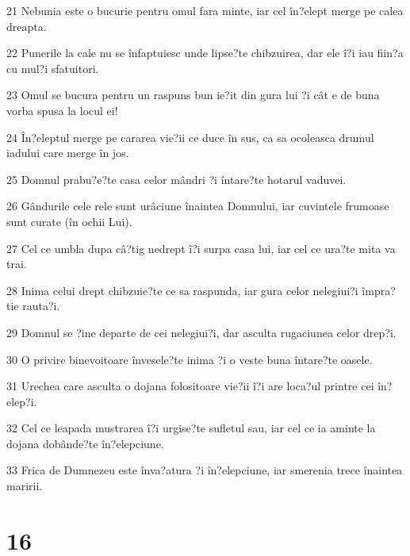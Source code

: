 \par 21 Nebunia este o bucurie pentru omul fara minte, iar cel în?elept merge pe calea dreapta.
\par 22 Punerile la cale nu se înfaptuiesc unde lipse?te chibzuirea, dar ele î?i iau fiin?a cu mul?i sfatuitori.
\par 23 Omul se bucura pentru un raspuns bun ie?it din gura lui ?i cât e de buna vorba spusa la locul ei!
\par 24 În?eleptul merge pe cararea vie?ii ce duce în sus, ca sa ocoleasca drumul iadului care merge în jos.
\par 25 Domnul prabu?e?te casa celor mândri ?i întare?te hotarul vaduvei.
\par 26 Gândurile cele rele sunt urâciune înaintea Domnului, iar cuvintele frumoase sunt curate (în ochii Lui).
\par 27 Cel ce umbla dupa câ?tig nedrept î?i surpa casa lui, iar cel ce ura?te mita va trai.
\par 28 Inima celui drept chibzuie?te ce sa raspunda, iar gura celor nelegiui?i împra?tie rauta?i.
\par 29 Domnul se ?ine departe de cei nelegiui?i, dar asculta rugaciunea celor drep?i.
\par 30 O privire binevoitoare învesele?te inima ?i o veste buna întare?te oasele.
\par 31 Urechea care asculta o dojana folositoare vie?ii î?i are loca?ul printre cei în?elep?i.
\par 32 Cel ce leapada mustrarea î?i urgise?te sufletul sau, iar cel ce ia aminte la dojana dobânde?te în?elepciune.
\par 33 Frica de Dumnezeu este înva?atura ?i în?elepciune, iar smerenia trece înaintea maririi.

\chapter{16}

